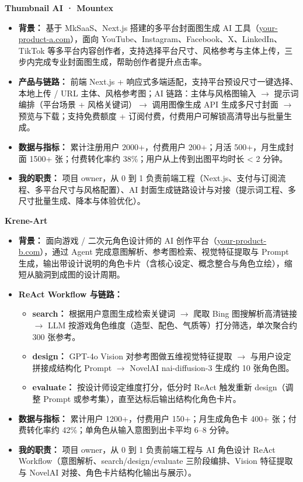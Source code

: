 \documentclass[10pt]{article}
\newcommand{\CProdA}{your-product-a.com}            %
\newcommand{\CProdB}{your-product-b.com}
\newcommand{\ptitle}[1]{\vspace{2pt}\par{\color{accent}\sffamily\bfseries #1}\par\vspace{1pt}}
\begin{document}
\ptitle{Thumbnail AI · Mountex}
\begin{itemize}
\item \textbf{背景：} 基于 MkSaaS、Next.js 搭建的多平台封面图生成 AI 工具（\href{https://\CProdA}{\CProdA}），面向 YouTube、Instagram、Facebook、X、LinkedIn、TikTok 等多平台内容创作者，支持选择平台尺寸、风格参考与主体上传，三步内完成专业封面图生成，帮助创作者提升点击率。
\item \textbf{产品与链路：} 前端 Next.js + 响应式多端适配，支持平台预设尺寸一键选择、本地上传 / URL 主体、风格参考图；AI 链路：主体与风格图输入 $\rightarrow$ 提示词编排（平台场景 + 风格关键词）$\rightarrow$ 调用图像生成 API 生成多尺寸封面 $\rightarrow$ 预览与下载；支持免费额度 + 订阅付费，付费用户可解锁高清导出与批量生成。
\item \textbf{数据与指标：} 累计注册用户 2000+，付费用户 200+；月活 500+，月生成封面 1500+ 张；付费转化率约 38\%；用户从上传到出图平均时长 < 2 分钟。
\item \textbf{我的职责：} 项目 owner，从 0 到 1 负责前端工程（Next.js、支付与订阅流程、多平台尺寸与风格配置）、AI 封面生成链路设计与对接（提示词工程、多尺寸批量生成、降本与体验优化）。
\end{itemize}

\ptitle{Krene-Art}
\begin{itemize}
\item \textbf{背景：} 面向游戏 / 二次元角色设计师的 AI 创作平台（\href{https://\CProdB}{\CProdB}），通过 Agent 完成意图解析、参考图检索、视觉特征提取与 Prompt 生成，输出带设计说明的角色卡片（含核心设定、概念整合与角色立绘），缩短从脑洞到成图的设计周期。
\item \textbf{ReAct Workflow 与链路：}
  \begin{itemize}[label=$\circ$]
  \item \textbf{search：} 根据用户意图生成检索关键词 $\rightarrow$ 爬取 Bing 图搜解析高清链接 $\rightarrow$ LLM 按游戏角色维度（造型、配色、气质等）打分筛选，单次聚合约 300 张参考。
  \item \textbf{design：} GPT-4o Vision 对参考图做五维视觉特征提取 $\rightarrow$ 与用户设定拼接成结构化 Prompt $\rightarrow$ NovelAI nai-diffusion-3 生成约 10 张角色图。
  \item \textbf{evaluate：} 按设计师设定维度打分，低分时 ReAct 触发重新 design（调整 Prompt 或参考集），直至达标后输出结构化角色卡片。
  \end{itemize}
\item \textbf{数据与指标：} 累计用户 1200+，付费用户 150+；月生成角色卡 400+ 张；付费转化率约 42\%；单角色从输入意图到出卡平均 6--8 分钟。
\item \textbf{我的职责：} 项目 owner，从 0 到 1 负责前端工程与 AI 角色设计 ReAct Workflow（意图解析、search/design/evaluate 三阶段编排、Vision 特征提取与 NovelAI 对接、角色卡片结构化输出与展示）。
\end{itemize}
\end{document}
